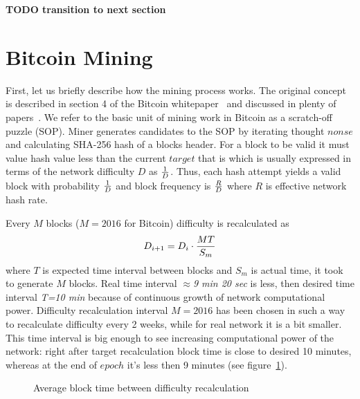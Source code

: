 \documentclass[number,preprint,review]{elsarticle}
\begin{document}
\textbf{TODO transition to next section}

\section{Bitcoin Mining}
\label{sec:bit}

First, let us briefly describe how the mining process works.
The original concept is described in section 4 of the Bitcoin whitepaper~\cite{Nakamoto2008} and discussed in plenty of papers~\cite{kraft2015difficulty, miller2014permacoin, eyal2014majority}.
We refer to the basic unit of mining work in Bitcoin as a scratch-off puzzle (SOP).
Miner generates candidates to the SOP by iterating thought \(nonse\) and calculating SHA-256 hash of a blocks header.
For a block to be valid it must value hash value less than the current \(target\) that is which is usually expressed in terms of the network difficulty \(D\) as \(1\over D\).
Thus, each hash attempt yields a valid block with probability \(1\over D\) and block frequency is \(R\over D\) where \(R\) is effective network hash rate.

Every \(M\) blocks (\(M=2016\) for Bitcoin) difficulty is recalculated as
\begin{equation}
D_{i+1}=D_i\cdot {MT\over S_m}
\end{equation}
where \(T\) is expected time interval between blocks and \(S_m\) is actual time, it took to generate \(M\) blocks.
Real time interval $\approx$\textit{9 min 20 sec} is less, then desired time interval \textit{T=10 min} because of continuous growth of network computational power.
Difficulty recalculation interval \(M=2016\) has been chosen in such a way to recalculate difficulty every 2 weeks, while for real network it is a bit smaller.
This time interval is big enough to see increasing computational power of the network: right after target recalculation block time is close to desired 10 minutes, whereas at the end of \(epoch\) it's less then 9 minutes (see figure~\ref{fig:image}).

\begin{figure}[h]
\caption{Average block time between difficulty recalculation}
\label{fig:image}
\end{figure}
\end{document}
